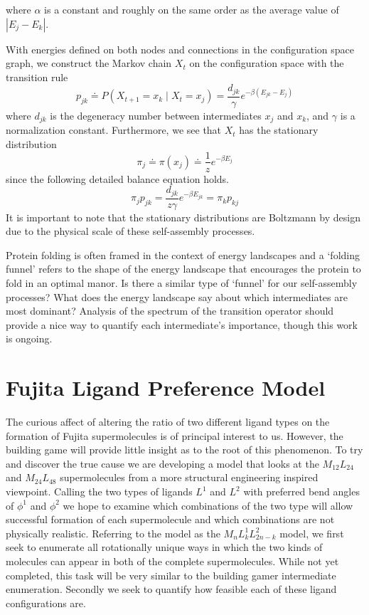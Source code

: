 \documentclass[12pt]{article}
\begin{document}
where $\alpha$ is a constant and roughly on the same order as the average value of $|E_j-E_k|$.

With energies defined on both nodes and connections in the configuration space graph, we construct the Markov chain $X_t$ on the configuration space with the transition rule
$$p_{jk} \doteq P\left(X_{t+1} = x_k \mid X_{t} = x_j\right) = \frac{d_{jk}}{\gamma}e^{-\beta\left(E_{jk}-E_j\right)}$$  
where $d_{jk}$ is the degeneracy number between intermediates $x_j$ and $x_k$, and $\gamma$ is a normalization constant.
Furthermore, we see that $X_t$ has the stationary distribution 
$$\pi_j \doteq \pi\left(x_j\right) \doteq \frac{1}{z}e^{-\beta E_j}$$
since the following detailed balance equation holds.
$$\pi_jp_{jk} = \frac{d_{jk}}{z\gamma}e^{-\beta E_{jk}} = \pi_kp_{kj}$$
It is important to note that the stationary distributions are Boltzmann by design due to the physical scale of these self-assembly processes.

Protein folding is often framed in the context of energy landscapes and a `folding funnel' refers to the shape of the energy landscape that encourages the protein to fold in an optimal manor. Is there a similar type of `funnel' for our self-assembly processes? What does the energy landscape say about which intermediates are most dominant? Analysis of the spectrum of the transition operator should provide a nice way to quantify each intermediate's importance, though this work is ongoing. 


\section{Fujita Ligand Preference Model}

The curious affect of altering the ratio of two different ligand types on the formation of Fujita supermolecules is of principal interest to us. However, the building game will provide little insight as to the root of this phenomenon. To try and discover the true cause we are developing a model that looks at the $M_{12}L_{24}$ and $M_{24}L_{48}$ supermolecules from a more structural engineering inspired viewpoint. Calling the two types of ligands $L^1$ and $L^2$ with preferred bend angles of $\phi^1$ and $\phi^2$ we hope to examine which combinations of the two type will allow successful formation of each supermolecule and which combinations are not physically realistic. Referring to the model as the $M_{n}L^1_{k}L^2_{2n-k}$ model, we first seek to enumerate all rotationally unique ways in which the two kinds of molecules can appear in both of the complete supermolecules. While not yet completed, this task will be very similar to the building gamer intermediate enumeration. Secondly we seek to quantify how feasible each of these ligand configurations are. 
\end{document}
